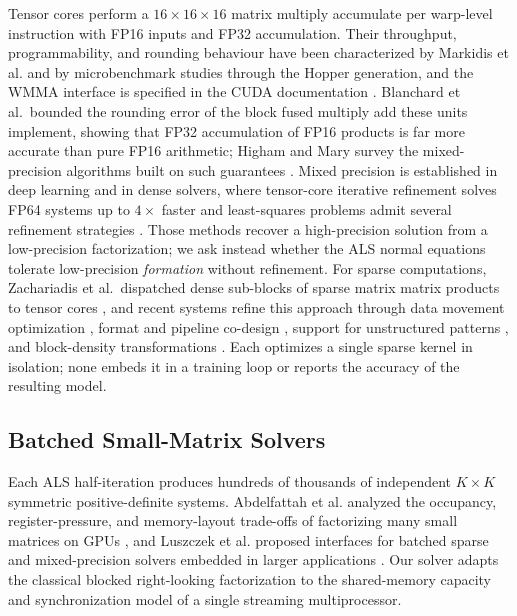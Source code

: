 Tensor cores perform a $16\times16 \times16$ matrix multiply accumulate per warp-level instruction with FP16 inputs and FP32 accumulation. Their throughput, programmability, and rounding behaviour have been characterized by Markidis et al.\cite{markidis2018nvidia} and by microbenchmark studies through the Hopper generation\cite{jia2018dissecting,luo2024hopper}, and the WMMA interface is specified in the CUDA documentation \cite{nvidia2023cuda}. Blanchard et al.\ bounded the rounding error of the block fused multiply add these units implement, showing that FP32 accumulation of FP16 products is far more accurate than pure FP16 arithmetic\cite{blanchard2020mixed}; Higham and Mary survey the mixed-precision algorithms built on such guarantees \cite{higham2002accuracy,higham2022mixed}. Mixed precision is established in deep learning \cite{micikevicius2018mixed} and in dense solvers, where tensor-core iterative refinement solves FP64 systems up to $4\times$ faster \cite{haidar2018harnessing} and least-squares problems admit several refinement strategies \cite{carson2025comparison}. Those methods recover a high-precision solution from a low-precision factorization; we ask instead whether the ALS normal equations tolerate low-precision \textit{formation} without refinement. For sparse computations, Zachariadis et al.\ dispatched dense sub-blocks of sparse matrix matrix products to tensor cores \cite{zachariadis2020accelerating}, and recent systems refine this approach through data movement optimization \cite{fan2024dtcspmm}, format and pipeline co-design \cite{zhao2025accspmm}, support for unstructured patterns \cite{okanovic2024unstructured}, and block-density transformations \cite{dong2026blocksmith}. Each optimizes a single sparse kernel in isolation; none embeds it in a training loop or reports the accuracy of the resulting model.

\subsection{Batched Small-Matrix Solvers}

Each ALS half-iteration produces hundreds of thousands of independent $K\times K$ symmetric positive-definite systems. Abdelfattah et al. analyzed the occupancy, register-pressure, and memory-layout trade-offs of factorizing many small matrices on GPUs \cite{abdelfattah2017factorization}, and Luszczek et al. proposed interfaces for batched sparse and mixed-precision solvers embedded in larger applications \cite{luszczek2024batched}. Our solver adapts the classical blocked right-looking factorization \cite{golub2013matrix} to the shared-memory capacity and synchronization model of a single streaming multiprocessor.

